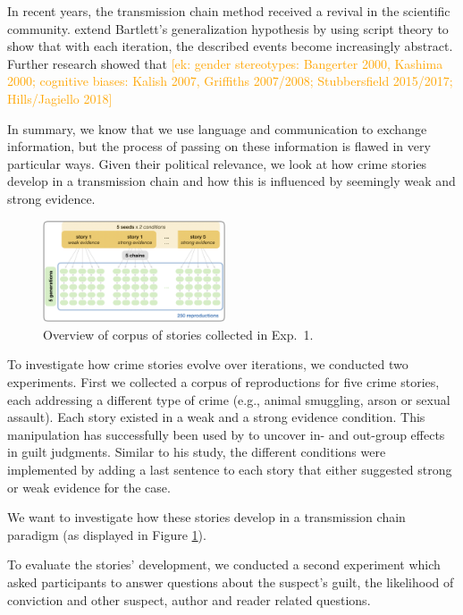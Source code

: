\documentclass[10pt,letterpaper]{article}
\newcommand{\ek}[1]{\textcolor{Orange}{[ek: #1]}}
\begin{document}
In recent years, the transmission chain method received a revival in the scientific community.  extend Bartlett's generalization hypothesis by using script theory to show that with each iteration, the described events become increasingly abstract. Further research showed that \ek{gender stereotypes: Bangerter 2000, Kashima 2000; cognitive biases: Kalish 2007, Griffiths 2007/2008; Stubbersfield 2015/2017; Hills/Jagiello 2018}

In summary, we know that we use language and communication to exchange information, but the process of passing on these information is flawed in very particular ways. Given their political relevance, we look at how crime stories develop in a transmission chain and how this is influenced by seemingly weak and strong evidence.

\begin{figure}[]
	\includegraphics[width=0.48\textwidth]{pics/corpus_overview.png}
	\caption{Overview of corpus of stories collected in Exp.~1.} 
	\label{fig:design}
\end{figure}

To investigate how crime stories evolve over iterations, we conducted two experiments. First we collected a corpus of reproductions for five crime stories, each addressing a different type of crime (e.g., animal smuggling, arson or sexual assault). Each story existed in a weak and a strong evidence condition. This manipulation has successfully been used by \cite{Van-Prooijen:2006} to uncover in- and out-group effects in guilt judgments. Similar to his study, the different conditions were implemented by adding a last sentence to each story that either suggested strong or weak evidence for the case.

We want to investigate how these stories develop in a transmission chain paradigm (as displayed in Figure \ref{fig:design}).

To evaluate the stories' development, we conducted a second experiment which asked participants to answer questions about the suspect's guilt, the likelihood of conviction and other suspect, author and reader related questions. 
\end{document}
